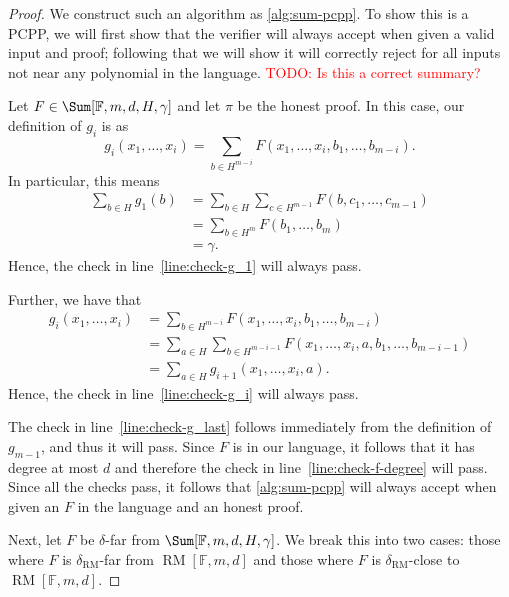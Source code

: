 \documentclass[english,12pt]{reedthesis}
\theoremstyle{plain}
\theoremstyle{definition}
\theoremstyle{remark}
\DeclareMathOperator{\RM}{RM}
\newcommand{\TODO}[1]{\textcolor{red}{TODO: #1}}
\begin{document}
\begin{proof} %
  We construct such an algorithm as \cref{alg:sum-pcpp}. To show this is a PCPP,
  we will first show that the verifier will always accept when given a valid
  input and proof; following that we will show it will correctly reject for all
  inputs not near any polynomial in the language. \TODO{Is this a correct
    summary?}

  Let $F \in \Sum[\mathbb{F}, m, d, H, \gamma]$ and let $\pi$ be the honest proof. In
  this case, our definition of $g_{i}$ is as
  \begin{equation}
    g_{i}(x_{1}, \ldots, x_{i}) = \sum_{b \in H^{m-i}}F(x_{1}, \ldots, x_{i}, b_{1}, \ldots, b_{m-i}).
  \end{equation}
  In particular, this means
  \begin{align*}
    \sum_{b \in H}g_{1}(b) &= \sum_{b \in H}\sum_{c \in H^{m-1}}F(b, c_{1}, \ldots, c_{m-1}) \\
                      &= \sum_{b \in H^{m}}F(b_{1}, \ldots, b_{m}) \\
                      &= \gamma.
  \end{align*}
  Hence, the check in line~\ref{line:check-g_1} will always pass.

  Further, we have that
  \begin{align*}
    g_{i}(x_{1}, \ldots, x_{i}) &= \sum_{b \in H^{m-i}}F(x_{1}, \ldots, x_{i}, b_{1}, \ldots, b_{m-i}) \\
                           &= \sum_{a \in H}\sum_{b \in H^{m-i-1}}F(x_{1}, \ldots, x_{i}, a, b_{1}, \ldots, b_{m-i-1}) \\
                           &= \sum_{a \in H}g_{i+1}(x_{1}, \ldots, x_{i}, a).
  \end{align*}
  Hence, the check in line~\ref{line:check-g_i} will always pass.

  The check in line~\ref{line:check-g_last} follows immediately from the
  definition of $g_{m-1}$, and thus it will pass. Since $F$ is in our language,
  it follows that it has degree at most $d$ and therefore the check in
  line~\ref{line:check-f-degree} will pass. Since all the checks pass, it
  follows that \cref{alg:sum-pcpp} will always accept when given an $F$ in the
  language and an honest proof.

  Next, let $F$ be $\delta$-far from $\Sum[\mathbb{F}, m, d, H, \gamma]$. We break this
  into two cases: those where $F$ is $\delta_{\RM}$-far from $\RM[\mathbb{F}, m, d]$
  and those where $F$ is $\delta_{\RM}$-close to $\RM[\mathbb{F}, m, d]$.


\end{proof}
\end{document}

